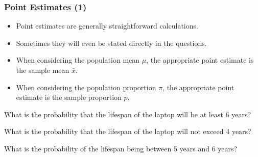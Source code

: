 \begin{frame}
\frametitle{Point Estimates (1) }

\begin{itemize}
\item Point estimates are generally straightforward calculations.
\item Sometimes they will even be stated directly in the questions.
\item When considering the population mean $\mu$, the appropriate point estimate is the sample mean $\bar{x}$.
\item When considering the population proportion $\pi$, the appropriate point estimate is the sample proportion $\hat{p}$.
\end{itemize}

\end{frame}









\item What is the probability that the lifespan of the laptop will be at least
6 years?
\item What is the probability that the lifespan of the laptop will not exceed
4 years?
\item What is the probability of the lifespan being between 5 years and 6
years?



